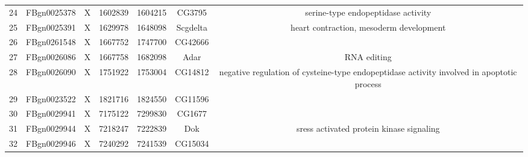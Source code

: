 \begin{tabular}{c|c|c|c|c|c | c}
24	&FBgn0025378	&X	&1602839	&1604215	&CG3795 & serine-type endopeptidase activity\\
25	&FBgn0025391	&X	&1629978	&1648098	&Scgdelta & heart contraction, mesoderm development\\
26	&FBgn0261548	&X	&1667752	&1747700	&CG42666\\
27	&FBgn0026086	&X	&1667758	&1682098	&Adar & RNA editing\\
28	&FBgn0026090	&X	&1751922	&1753004	&CG14812 & negative regulation of cysteine-type endopeptidase activity involved in apoptotic process\\
29	&FBgn0023522	&X	&1821716	&1824550	&CG11596&\\
30	&FBgn0029941	&X	&7175122	&7299830	&CG1677\\
31	&FBgn0029944	&X	&7218247	&7222839	&Dok & sress activated protein kinase signaling\\
32	&FBgn0029946	&X	&7240292	&7241539	&CG15034\\
\end{tabular}
